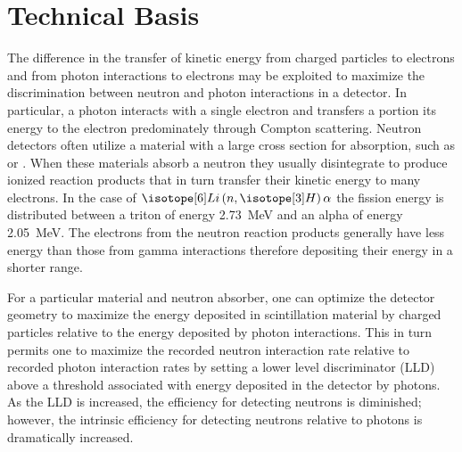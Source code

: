 \documentclass[draftcls,onecolumn]{IEEEtran}
\begin{document}
\section{Technical Basis}
The difference in the transfer of kinetic energy from charged particles to electrons and from photon interactions to electrons may be exploited to maximize the discrimination between neutron and photon interactions in a detector.  
In particular, a photon interacts with a single electron and transfers a portion its energy to the electron predominately through Compton scattering. 
Neutron detectors often utilize a material with a large cross section for absorption, such as  or .
When these materials absorb a neutron they usually disintegrate to produce ionized reaction products that in turn transfer their kinetic energy to many electrons.
In the case of $\iso[6]{Li}\left(n,\iso[3]{H}\right)\alpha$ the fission energy is distributed between a triton of energy \SI{2.73}{\mega\eV} and an alpha of energy \SI{2.05}{\mega\eV}.
The electrons from the neutron reaction products generally have less energy than those from gamma interactions therefore depositing their energy in a shorter range.

For a particular material and neutron absorber, one can optimize the detector geometry to maximize the energy deposited in scintillation material by charged particles relative to the energy deposited by photon interactions. 
This in turn permits one to maximize the recorded neutron interaction rate relative to recorded photon interaction rates by setting a lower level discriminator (LLD) above a threshold associated with energy deposited in the detector by photons.  
As the LLD is increased, the efficiency for detecting neutrons is diminished; however, the intrinsic efficiency for detecting neutrons relative to photons is dramatically increased. 
\end{document}
